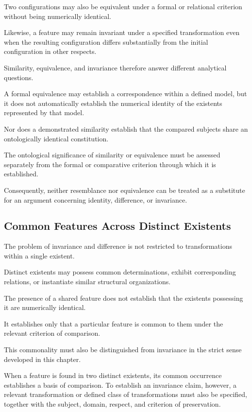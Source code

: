 Two configurations may also be equivalent
under a formal or relational criterion
without being numerically identical.

Likewise, a feature may remain invariant
under a specified transformation even
when the resulting configuration differs
substantially from the initial configuration
in other respects.

Similarity, equivalence, and invariance
therefore answer different analytical
questions.

A formal equivalence may establish a
correspondence within a defined model,
but it does not automatically establish
the numerical identity of the existents
represented by that model.

Nor does a demonstrated similarity
establish that the compared subjects
share an ontologically identical
constitution.

The ontological significance of similarity
or equivalence must be assessed separately
from the formal or comparative criterion
through which it is established.

Consequently, neither resemblance nor
equivalence can be treated as a substitute
for an argument concerning identity,
difference, or invariance.

\subsection{Common Features Across Distinct Existents}

The problem of invariance and difference
is not restricted to transformations
within a single existent.

Distinct existents may possess common
determinations, exhibit corresponding
relations, or instantiate similar
structural organizations.

The presence of a shared feature does
not establish that the existents possessing
it are numerically identical.

It establishes only that a particular
feature is common to them under the
relevant criterion of comparison.

This commonality must also be distinguished
from invariance in the strict sense
developed in this chapter.

When a feature is found in two distinct
existents, its common occurrence establishes
a basis of comparison. To establish an
invariance claim, however, a relevant
transformation or defined class of
transformations must also be specified,
together with the subject, domain, respect,
and criterion of preservation.

